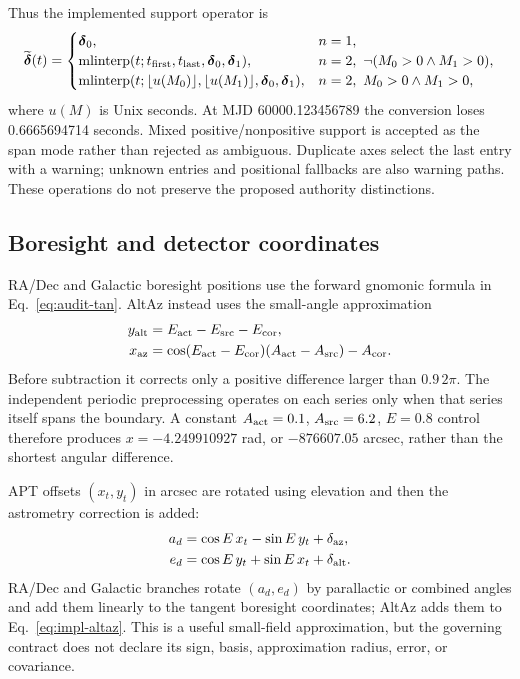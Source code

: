 \documentclass[11pt]{article}
\begin{document}
Thus the implemented support operator is
\begin{equation}
 \widetilde{\boldsymbol\delta}(t)=
 \begin{cases}
  \boldsymbol\delta_0,&n=1,\\
  \operatorname{mlinterp}(t; t_{\rm first},t_{\rm last},
       \boldsymbol\delta_0,\boldsymbol\delta_1),&n=2,\ \neg(M_0>0\land M_1>0),\\
  \operatorname{mlinterp}(t;\lfloor u(M_0)\rfloor,\lfloor u(M_1)\rfloor,
       \boldsymbol\delta_0,\boldsymbol\delta_1),&n=2,\ M_0>0\land M_1>0,
 \end{cases}
 \label{eq:impl-interp}
\end{equation}
where $u(M)$ is Unix seconds.  At MJD 60000.123456789 the conversion loses
0.6665694714 seconds.  Mixed positive/nonpositive support is accepted as the
span mode rather than rejected as ambiguous. Duplicate axes select the last
entry with a warning; unknown entries and positional fallbacks are also warning
paths. These operations do not preserve the proposed authority distinctions.

\subsection{Boresight and detector coordinates}

RA/Dec and Galactic boresight positions use the forward gnomonic formula in
Eq.~\eqref{eq:audit-tan}.  AltAz instead uses the small-angle approximation
\begin{align}
 y_{\rm alt}&=E_{\rm act}-E_{\rm src}-E_{\rm cor},\\
 x_{\rm az}&=\cos(E_{\rm act}-E_{\rm cor})
              (A_{\rm act}-A_{\rm src})-A_{\rm cor}.
 \label{eq:impl-altaz}
\end{align}
Before subtraction it corrects only a positive difference larger than
$0.9\,2\pi$.  The independent periodic preprocessing operates on each series
only when that series itself spans the boundary.  A constant
$A_{\rm act}=0.1$, $A_{\rm src}=6.2$, $E=0.8$ control therefore produces
$x=-4.249910927$ rad, or $-876607.05$ arcsec, rather than the shortest
angular difference.

APT offsets $(x_t,y_t)$ in arcsec are rotated using elevation and then the
astrometry correction is added:
\begin{align}
 a_d &= \cos E\,x_t-\sin E\,y_t+\delta_{\rm az},\\
 e_d &= \cos E\,y_t+\sin E\,x_t+\delta_{\rm alt}.
 \label{eq:impl-fp}
\end{align}
RA/Dec and Galactic branches rotate $(a_d,e_d)$ by parallactic or combined
angles and add them linearly to the tangent boresight coordinates; AltAz adds
them to Eq.~\eqref{eq:impl-altaz}. This is a useful small-field approximation,
but the governing contract does not declare its sign, basis, approximation
radius, error, or covariance.
\end{document}
